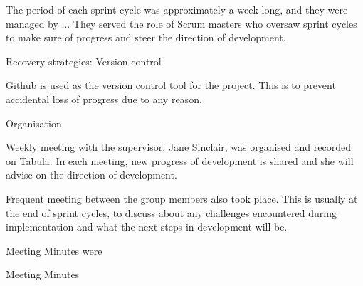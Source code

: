 The period of each sprint cycle was approximately a week long, and they were managed by ... They served the role of Scrum masters who oversaw sprint cycles to make sure of progress and steer the direction of development.
 









Recovery strategies: Version control

Github is used as the version control tool for the project. This is to prevent accidental loss of progress due to any reason.






Organisation

Weekly meeting with the supervisor, Jane Sinclair, was organised and recorded on Tabula. In each meeting, new progress of development is shared and she will advise on the direction of development.

Frequent meeting between the group members also took place. This is usually at the end of sprint cycles, to discuss about any challenges encountered during implementation and what the next steps in development will be.




Meeting Minutes were 




Meeting Minutes









